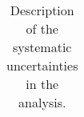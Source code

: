 \begin{table}[tbp]
\begin{center}
\begin{tabular}{| l | l |}
\end{tabular}
\caption{Description of the systematic uncertainties in the analysis. }
\label{tab:systematics-table}
\end{center}
\end{table}




